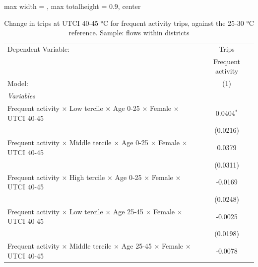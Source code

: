 
\begin{table}[htbp]
   \caption{\label{table_intersectionality_frequent_activity_40-45} Change in trips at UTCI 40-45 °C for frequent activity trips, against the 25-30 °C reference. Sample: flows within districts}
   \centering
   \small
   \begin{adjustbox}{max width = \textwidth, max totalheight = 0.9\textheight, center}
      \begin{tabular}{lc}
         \tabularnewline \midrule \midrule
         Dependent Variable:                                                                                   & Trips\\  
                                                                                                               & Frequent activity \\   
         Model:                                                                                                & (1)\\  
         \midrule
         \emph{Variables}\\
         Frequent activity $\times$ Low tercile $\times$ Age 0-25 $\times$ Female $\times$ UTCI 40-45          & 0.0404$^{*}$\\   
                                                                                                               & (0.0216)\\   
         Frequent activity $\times$ Middle tercile $\times$ Age 0-25 $\times$ Female $\times$ UTCI 40-45       & 0.0379\\   
                                                                                                               & (0.0311)\\   
         Frequent activity $\times$ High tercile $\times$ Age 0-25 $\times$ Female $\times$ UTCI 40-45         & -0.0169\\   
                                                                                                               & (0.0248)\\   
         Frequent activity $\times$ Low tercile $\times$ Age 25-45 $\times$ Female $\times$ UTCI 40-45         & -0.0025\\   
                                                                                                               & (0.0198)\\   
         Frequent activity $\times$ Middle tercile $\times$ Age 25-45 $\times$ Female $\times$ UTCI 40-45      & -0.0078\\   

\end{tabular}
\end{adjustbox}
\end{table}
